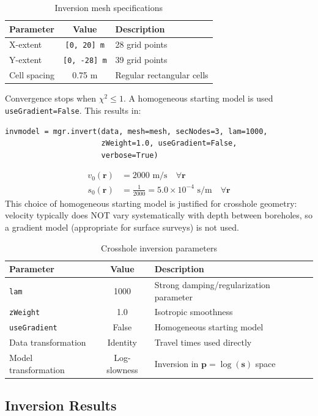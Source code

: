 \begin{table}[H]
\centering
\caption{Inversion mesh specifications}
\begin{tabular}{|l|c|p{6cm}|}
\hline
\textbf{Parameter} & \textbf{Value} & \textbf{Description} \\
\hline
X-extent & \texttt{[0, 20] m} & 28 grid points \\
Y-extent & \texttt{[0, -28] m} & 39 grid points \\
Cell spacing & 0.75 m & Regular rectangular cells \\
\hline
\end{tabular}
\end{table}
Convergence stops when $\chi^2\le1$. A homogeneous starting model is used \texttt{useGradient=False}. This results in:
\begin{verbatim}
invmodel = mgr.invert(data, mesh=mesh, secNodes=3, lam=1000, 
                      zWeight=1.0, useGradient=False, 
                      verbose=True)
\end{verbatim}
\begin{align*}
v_0(\mathbf{r}) &= 2000 \text{ m/s} \quad \forall \mathbf{r} \\
s_0(\mathbf{r}) &= \frac{1}{2000} = 5.0 \times 10^{-4} \text{ s/m} \quad \forall \mathbf{r}
\end{align*}
This choice of homogeneous starting model is justified for crosshole geometry: velocity typically does NOT vary systematically with depth between boreholes, so a gradient model (appropriate for surface surveys) is not used.
\begin{table}[H]
\centering
\caption{Crosshole inversion parameters}
\begin{tabular}{|l|c|p{7cm}|}
\hline
\textbf{Parameter} & \textbf{Value} & \textbf{Description} \\
\hline
\texttt{lam} & 1000 & Strong damping/regularization parameter \\
\texttt{zWeight} & 1.0 & Isotropic smoothness \\
\texttt{useGradient} & False & Homogeneous starting model \\
Data transformation & Identity & Travel times used directly \\
Model transformation & Log-slowness & Inversion in $\mathbf{p} = \log(\mathbf{s})$ space \\
\hline
\end{tabular}
\end{table}

\subsection*{Inversion Results}

